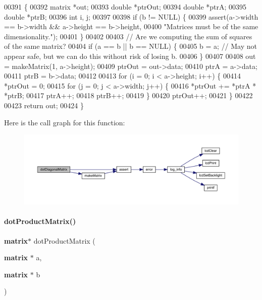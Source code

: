 \begin{DoxyCode}
00391                                                 \{
00392   matrix *out;
00393   \textcolor{keywordtype}{double} *ptrOut;
00394   \textcolor{keywordtype}{double} *ptrA;
00395   \textcolor{keywordtype}{double} *ptrB;
00396   \textcolor{keywordtype}{int} i, j;
00397 
00398   \textcolor{keywordflow}{if} (b != NULL) \{
00399     assert(a->width == b->width && a->height == b->height,
00400            \textcolor{stringliteral}{"Matrices must be of the same dimensionality."});
00401   \}
00402 
00403   \textcolor{comment}{// Are we computing the sum of squares of the same matrix?}
00404   \textcolor{keywordflow}{if} (a == b || b == NULL) \{
00405     b = a; \textcolor{comment}{// May not appear safe, but we can do this without risk of losing b.}
00406   \}
00407 
00408   out = makeMatrix(1, a->height);
00409   ptrOut = out->data;
00410   ptrA = a->data;
00411   ptrB = b->data;
00412 
00413   \textcolor{keywordflow}{for} (i = 0; i < a->height; i++) \{
00414     *ptrOut = 0;
00415     \textcolor{keywordflow}{for} (j = 0; j < a->width; j++) \{
00416       *ptrOut += *ptrA * *ptrB;
00417       ptrA++;
00418       ptrB++;
00419     \}
00420     ptrOut++;
00421   \}
00422 
00423   \textcolor{keywordflow}{return} out;
00424 \}
\end{DoxyCode}
Here is the call graph for this function\+:
\nopagebreak
\begin{figure}[H]
\begin{center}
\leavevmode
\includegraphics[width=350pt]{matrix_8c_af49b525d7476c365833db9acd975e3a5_cgraph}
\end{center}
\end{figure}
\mbox{\label{matrix_8c_a0b568a64e81a56779c2141b424475976}} 
\paragraph{dot\+Product\+Matrix()}
{\footnotesize\ttfamily \textbf{ matrix}$\ast$ dot\+Product\+Matrix (\begin{DoxyParamCaption}\item[{\textbf{ matrix} $\ast$}]{a,  }\item[{\textbf{ matrix} $\ast$}]{b }\end{DoxyParamCaption})}



